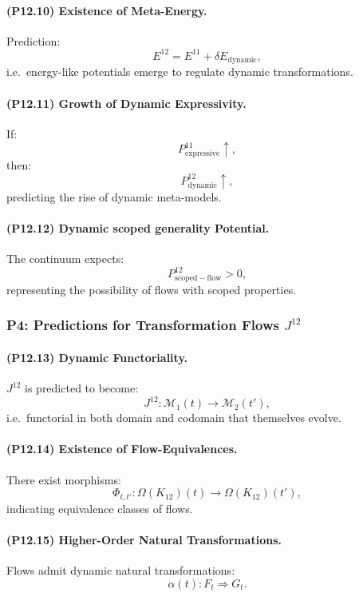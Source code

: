 \paragraph{(P12.10) Existence of Meta-Energy.}
Prediction:
\[
E^{12} = E^{11} + \delta E_{\mathrm{dynamic}},
\]
i.e.\ energy-like potentials emerge to regulate dynamic transformations.

\paragraph{(P12.11) Growth of Dynamic Expressivity.}
If:
\[
P_{\mathrm{expressive}}^{11} \uparrow,
\]
then:
\[
P_{\mathrm{dynamic}}^{12} \uparrow,
\]
predicting the rise of dynamic meta-models.

\paragraph{(P12.12) Dynamic scoped generality Potential.}
The continuum expects:
\[
P_{\mathrm{scoped-flow}}^{12} > 0,
\]
representing the possibility of flows with scoped properties.

\subsubsection{P4: Predictions for Transformation Flows $J^{12}$}

\paragraph{(P12.13) Dynamic Functoriality.}
$J^{12}$ is predicted to become:
\[
J^{12}: \mathcal{M}_1(t) \to \mathcal{M}_2(t'),
\]
i.e.\ functorial in both domain and codomain that themselves evolve.

\paragraph{(P12.14) Existence of Flow-Equivalences.}
There exist morphisms:
\[
\Phi_{t,t'}: \Omega(K_{12})(t) \to \Omega(K_{12})(t'),
\]
indicating equivalence classes of flows.

\paragraph{(P12.15) Higher-Order Natural Transformations.}
Flows admit dynamic natural transformations:
\[
\alpha(t): F_t \Rightarrow G_t.
\]

